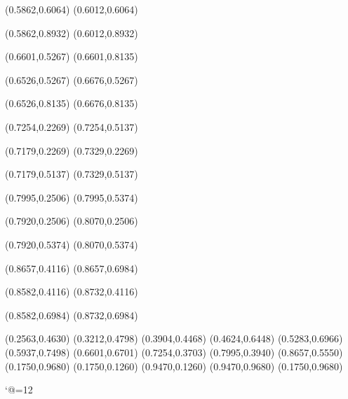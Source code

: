 \PST@Solid(0.5862,0.6064)
(0.6012,0.6064)

\PST@Solid(0.5862,0.8932)
(0.6012,0.8932)

\PST@Solid(0.6601,0.5267)
(0.6601,0.8135)

\PST@Solid(0.6526,0.5267)
(0.6676,0.5267)

\PST@Solid(0.6526,0.8135)
(0.6676,0.8135)

\PST@Solid(0.7254,0.2269)
(0.7254,0.5137)

\PST@Solid(0.7179,0.2269)
(0.7329,0.2269)

\PST@Solid(0.7179,0.5137)
(0.7329,0.5137)

\PST@Solid(0.7995,0.2506)
(0.7995,0.5374)

\PST@Solid(0.7920,0.2506)
(0.8070,0.2506)

\PST@Solid(0.7920,0.5374)
(0.8070,0.5374)

\PST@Solid(0.8657,0.4116)
(0.8657,0.6984)

\PST@Solid(0.8582,0.4116)
(0.8732,0.4116)

\PST@Solid(0.8582,0.6984)
(0.8732,0.6984)

\PST@Diamond(0.2563,0.4630)
\PST@Diamond(0.3212,0.4798)
\PST@Diamond(0.3904,0.4468)
\PST@Diamond(0.4624,0.6448)
\PST@Diamond(0.5283,0.6966)
\PST@Diamond(0.5937,0.7498)
\PST@Diamond(0.6601,0.6701)
\PST@Diamond(0.7254,0.3703)
\PST@Diamond(0.7995,0.3940)
\PST@Diamond(0.8657,0.5550)
\PST@Border(0.1750,0.9680)
(0.1750,0.1260)
(0.9470,0.1260)
(0.9470,0.9680)
(0.1750,0.9680)

\catcode`@=12
\fi
\endpspicture
